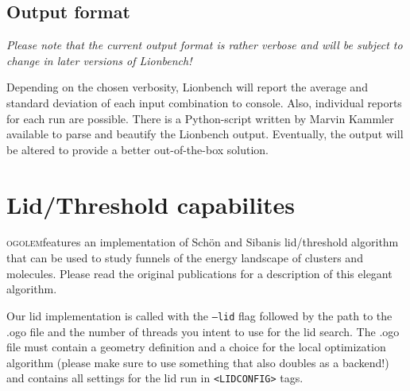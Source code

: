 \documentclass[a4paper,10pt]{scrbook}
\newcommand{\ogo}{\textsc{ogolem}}
\begin{document}
\section{Output format}
\emph{Please note that the current output format is rather verbose and will be 
subject to change in later versions of Lionbench!}

Depending on the chosen verbosity, Lionbench will report the average and 
standard deviation of each input combination to console. Also, individual 
reports for each run are possible. There is a Python-script written by Marvin 
Kammler available to parse and beautify the Lionbench output. Eventually, the 
output will be altered to provide a better out-of-the-box solution.

\chapter{Lid/Threshold capabilites}
\ogo features an implementation of Sch\"on and Sibanis lid/threshold algorithm
that can be used to study funnels of the energy landscape of clusters and
molecules. Please read the original publications for a description of this
elegant algorithm.

Our lid implementation is called with the \texttt{--lid} flag followed by the
path to the .ogo file and the number of threads you intent to use for the lid
search. The .ogo file must contain a geometry definition and a choice for the
local optimization algorithm (please make sure to use something that also
doubles as a backend!) and contains all settings for the lid run in
\texttt{<LIDCONFIG>} tags.
\end{document}
